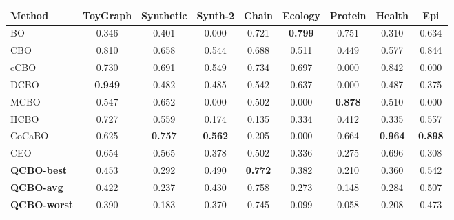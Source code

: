 \begin{tabular}{@{}lcccccccc@{}}
\toprule
\textbf{Method} & ToyGraph & Synthetic & Synth-2 & Chain & Ecology & Protein & Health & Epi \\
\midrule
BO & 0.346 & 0.401 & 0.000 & 0.721 & \textbf{0.799} & 0.751 & 0.310 & 0.634 \\
CBO & 0.810 & 0.658 & 0.544 & 0.688 & 0.511 & 0.449 & 0.577 & 0.844 \\
cCBO & 0.730 & 0.691 & 0.549 & 0.734 & 0.697 & 0.000 & 0.842 & 0.000 \\
DCBO & \textbf{0.949} & 0.482 & 0.485 & 0.542 & 0.637 & 0.000 & 0.487 & 0.375 \\
MCBO & 0.547 & 0.652 & 0.000 & 0.502 & 0.000 & \textbf{0.878} & 0.510 & 0.000 \\
HCBO & 0.727 & 0.559 & 0.174 & 0.135 & 0.334 & 0.412 & 0.335 & 0.557 \\
CoCaBO & 0.625 & \textbf{0.757} & \textbf{0.562} & 0.205 & 0.000 & 0.664 & \textbf{0.964} & \textbf{0.898} \\
CEO & 0.654 & 0.565 & 0.378 & 0.502 & 0.336 & 0.275 & 0.696 & 0.308 \\
\midrule
\textbf{QCBO-best} & 0.453 & 0.292 & 0.490 & \textbf{0.772} & 0.382 & 0.210 & 0.360 & 0.542 \\
\textbf{QCBO-avg} & 0.422 & 0.237 & 0.430 & 0.758 & 0.273 & 0.148 & 0.284 & 0.507 \\
\textbf{QCBO-worst} & 0.390 & 0.183 & 0.370 & 0.745 & 0.099 & 0.058 & 0.208 & 0.473 \\
\bottomrule
\end{tabular}

